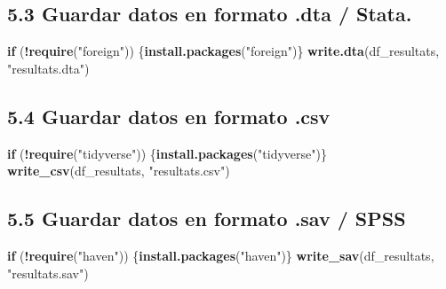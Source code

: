\documentclass[
]{article}
\newenvironment{Shaded}{\begin{snugshade}}{\end{snugshade}}
\newcommand{\ControlFlowTok}[1]{\textcolor[rgb]{0.13,0.29,0.53}{\textbf{#1}}}
\newcommand{\FunctionTok}[1]{\textcolor[rgb]{0.13,0.29,0.53}{\textbf{#1}}}
\newcommand{\NormalTok}[1]{#1}
\newcommand{\SpecialCharTok}[1]{\textcolor[rgb]{0.81,0.36,0.00}{\textbf{#1}}}
\newcommand{\StringTok}[1]{\textcolor[rgb]{0.31,0.60,0.02}{#1}}
\begin{document}
\hypertarget{guardar-datos-en-formato-.dta-stata.}{%
\subsection{5.3 Guardar datos en formato .dta /
Stata.}\label{guardar-datos-en-formato-.dta-stata.}}

\begin{Shaded}
\begin{Highlighting}[]
\ControlFlowTok{if}\NormalTok{ (}\SpecialCharTok{!}\FunctionTok{require}\NormalTok{(}\StringTok{"foreign"}\NormalTok{)) \{}\FunctionTok{install.packages}\NormalTok{(}\StringTok{"foreign"}\NormalTok{)\}}
\FunctionTok{write.dta}\NormalTok{(df\_resultats, }\StringTok{"resultats.dta"}\NormalTok{)}
\end{Highlighting}
\end{Shaded}

\hypertarget{guardar-datos-en-formato-.csv}{%
\subsection{5.4 Guardar datos en formato
.csv}\label{guardar-datos-en-formato-.csv}}

\begin{Shaded}
\begin{Highlighting}[]
\ControlFlowTok{if}\NormalTok{ (}\SpecialCharTok{!}\FunctionTok{require}\NormalTok{(}\StringTok{"tidyverse"}\NormalTok{)) \{}\FunctionTok{install.packages}\NormalTok{(}\StringTok{"tidyverse"}\NormalTok{)\}}
\FunctionTok{write\_csv}\NormalTok{(df\_resultats, }\StringTok{"resultats.csv"}\NormalTok{)}
\end{Highlighting}
\end{Shaded}

\hypertarget{guardar-datos-en-formato-.sav-spss}{%
\subsection{5.5 Guardar datos en formato .sav /
SPSS}\label{guardar-datos-en-formato-.sav-spss}}

\begin{Shaded}
\begin{Highlighting}[]
\ControlFlowTok{if}\NormalTok{ (}\SpecialCharTok{!}\FunctionTok{require}\NormalTok{(}\StringTok{"haven"}\NormalTok{)) \{}\FunctionTok{install.packages}\NormalTok{(}\StringTok{"haven"}\NormalTok{)\}}
\FunctionTok{write\_sav}\NormalTok{(df\_resultats, }\StringTok{"resultats.sav"}\NormalTok{)}
\end{Highlighting}
\end{Shaded}
\end{document}
